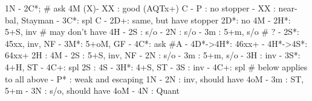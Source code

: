 1N - 2C*;  # ask 4M
(X)- XX : good (AQTx+) C
   - P  : no stopper
        - XX : near-bal, Stayman
        - 3C*: spl C
   - 2D+: same, but have stopper
2D*: no 4M
   - 2H*: 5+S, inv  # may don't have 4H
        - 2S : s/o
        - 2N : s/o
             - 3m : 5+m, s/o  # ?
   - 2S*: 45xx, inv, NF
   - 3M*: 5+oM, GF
   - 4C*: ask #A
   - 4D*->4H*: 46xx+ 
   - 4H*->4S*: 64xx+ 
2H : 4M
   - 2S : 5+S, inv, NF
        - 2N : s/o
             - 3m : 5+m, s/o
   - 3H : inv
   - 3S*: 4+H, ST
   - 4C+: spl
2S : 4S
   - 3H*: 4+S, ST
   - 3S : inv
   - 4C+: spl
# below applies to all above
   - P* : weak and escaping 1N
   - 2N : inv, should have 4oM
   - 3m : ST, 5+m
   - 3N : s/o, should have 4oM
   - 4N : Quant

